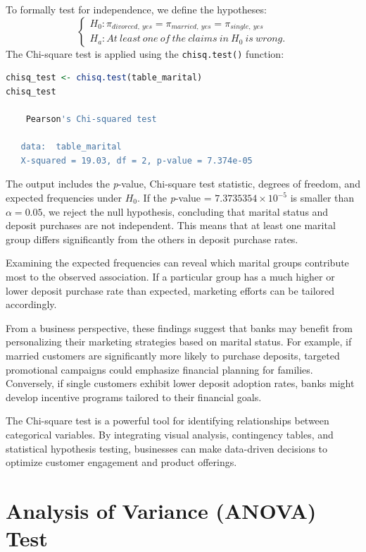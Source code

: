 \documentclass[
  11pt,
]{book}
\newcommand{\passthrough}[1]{#1}
\theoremstyle{definition}
\theoremstyle{definition}
\theoremstyle{definition}
\theoremstyle{definition}
\theoremstyle{remark}
\begin{document}
To formally test for independence, we define the hypotheses:
\[
\begin{cases}
    H_0: \pi_{divorced, \ yes} = \pi_{married, \ yes} = \pi_{single, \ yes}  \\
    H_a: At \ least \ one \ of \ the \ claims \ in \ H_0 \ is \ wrong.
\end{cases}
\]
The Chi-square test is applied using the \passthrough{\lstinline!chisq.test()!} function:

\begin{lstlisting}[language=R]
chisq_test <- chisq.test(table_marital)
chisq_test
   
    Pearson's Chi-squared test
   
   data:  table_marital
   X-squared = 19.03, df = 2, p-value = 7.374e-05
\end{lstlisting}

The output includes the \emph{p}-value, Chi-square test statistic, degrees of freedom, and expected frequencies under \(H_0\). If the \emph{p}-value = \ensuremath{7.3735354\times 10^{-5}} is smaller than \(\alpha = 0.05\), we reject the null hypothesis, concluding that marital status and deposit purchases are not independent. This means that at least one marital group differs significantly from the others in deposit purchase rates.

Examining the expected frequencies can reveal which marital groups contribute most to the observed association. If a particular group has a much higher or lower deposit purchase rate than expected, marketing efforts can be tailored accordingly.

From a business perspective, these findings suggest that banks may benefit from personalizing their marketing strategies based on marital status. For example, if married customers are significantly more likely to purchase deposits, targeted promotional campaigns could emphasize financial planning for families. Conversely, if single customers exhibit lower deposit adoption rates, banks might develop incentive programs tailored to their financial goals.

The Chi-square test is a powerful tool for identifying relationships between categorical variables. By integrating visual analysis, contingency tables, and statistical hypothesis testing, businesses can make data-driven decisions to optimize customer engagement and product offerings.

\section{Analysis of Variance (ANOVA) Test}\label{analysis-of-variance-anova-test}
\end{document}
